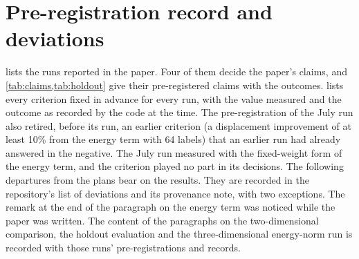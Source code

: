 \section{Pre-registration record and deviations}\label{app:prereg}

 lists the runs reported in the paper. Four of them decide the paper's claims, and
\cref{tab:claims,tab:holdout} give their pre-registered claims with the outcomes.  lists every criterion fixed in advance for every run, with the value
measured and the outcome as recorded by the code at the time. The pre-registration of the
July run also retired, before its run, an earlier criterion (a displacement improvement of
at least 10\% from the energy term with 64 labels) that an earlier run had already answered in the negative. The July run measured \numGOneRetired{} with the fixed-weight form of the
energy term, and the criterion played no part in its decisions. The following departures
from the plans bear on the results. They are recorded in the repository's list of deviations and its provenance note, with two
exceptions. The remark at the end of the paragraph on the energy term was noticed while the
paper was written. The content of the paragraphs on the two-dimensional comparison, the
holdout evaluation and the three-dimensional energy-norm run is recorded with those runs'
pre-registrations and records.

